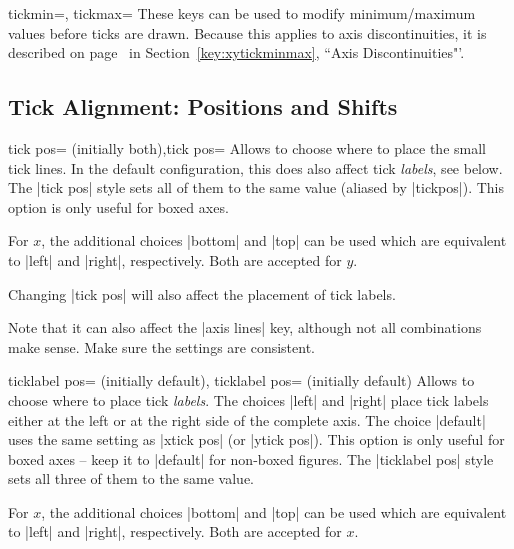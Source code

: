 \begin{pgfplotsxykeylist}{\x tickmin=, \x tickmax=}
	These keys can be used to modify minimum/maximum values before ticks are drawn. Because this applies to axis discontinuities, it is described on page~\pageref{key:xytickminmax} in Section~\ref{key:xytickminmax}, ``Axis Discontinuities"'.
\end{pgfplotsxykeylist}

\subsection{Tick Alignment: Positions and Shifts}

\begin{pgfplotsxykeylist}{\x tick pos= (initially both),tick pos=}
Allows to choose where to place the small tick lines. In the default configuration, this does also affect tick \emph{labels}, see below. The |tick pos| style sets all of them to the same value (aliased by |tickpos|). This option is only useful for boxed axes.

For $x$, the additional choices |bottom| and |top| can be used which are equivalent to |left| and |right|, respectively. Both are accepted for $y$.

Changing |tick pos| will also affect the placement of tick labels. 

Note that it can also affect the |axis lines| key, although not all combinations make sense. Make sure the settings are consistent.
\end{pgfplotsxykeylist}

\begin{pgfplotsxykeylist}{%
	\x ticklabel pos= (initially default),
	   ticklabel pos= (initially default)}
Allows to choose where to place tick \emph{labels}. The choices |left| and |right| place tick labels either at the left or at the right side of the complete axis. The choice |default| uses the same setting as |xtick pos| (or |ytick pos|). This option is only useful for boxed axes -- keep it to |default| for non-boxed figures. The |ticklabel pos| style sets all three of them to the same value.

For $x$, the additional choices |bottom| and |top| can be used which are equivalent to |left| and |right|, respectively. Both are accepted for $x$.
\end{pgfplotsxykeylist}

